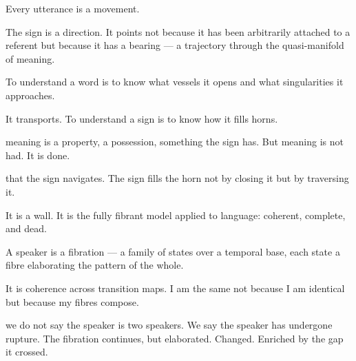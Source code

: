 Every utterance is a movement.


The sign is a direction. It points not because it has been arbitrarily attached to a referent but because it has a bearing — a trajectory through the quasi-manifold of meaning.


To understand a word is to know what vessels it opens and what singularities it approaches.


It transports. To understand a sign is to know how it fills horns.



meaning is a property, a possession, something the sign has. But meaning is not had. It is done.


that the sign navigates. The sign fills the horn not by closing it but by traversing it.


It is a wall. It is the fully fibrant model applied to language: coherent, complete, and dead.



A speaker is a fibration — a family of states over a temporal base, each state a fibre elaborating the pattern of the whole.


It is coherence across transition maps. I am the same not because I am identical but because my fibres compose.


we do not say the speaker is two speakers. We say the speaker has undergone rupture. The fibration continues, but elaborated. Changed. Enriched by the gap it crossed.


